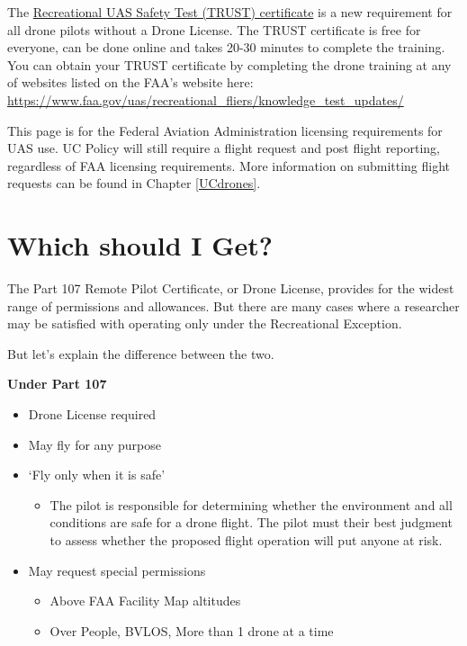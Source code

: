 \documentclass[
  12pt,
]{book}
\providecommand{\tightlist}{%
  \setlength{\itemsep}{0pt}\setlength{\parskip}{0pt}}
\newenvironment{notebox}{
  \definecolor{shadecolor}{gray}{.8}  %
  \color{black}
  \begin{shaded}}
 {\end{shaded}}
\begin{document}
The \protect\hyperlink{TRUST}{Recreational UAS Safety Test (TRUST) certificate} is a new requirement for all drone pilots without a Drone License. The TRUST certificate is free for everyone, can be done online and takes 20-30 minutes to complete the training. You can obtain your TRUST certificate by completing the drone training at any of websites listed on the FAA's website here: \url{https://www.faa.gov/uas/recreational_fliers/knowledge_test_updates/}

\begin{notebox}
This page is for the Federal Aviation Administration licensing requirements for UAS use. UC Policy will still require a flight request and post flight reporting, regardless of FAA licensing requirements. More information on submitting flight requests can be found in Chapter \ref{UCdrones}.

\end{notebox}

\hypertarget{difference}{%
\section{Which should I Get?}\label{difference}}

The Part 107 Remote Pilot Certificate, or Drone License, provides for the widest range of permissions and allowances. But there are many cases where a researcher may be satisfied with operating only under the Recreational Exception.

But let's explain the difference between the two.

\textbf{Under Part 107}

\begin{itemize}
\tightlist
\item
  Drone License required
\item
  May fly for any purpose
\item
  `Fly only when it is safe'

  \begin{itemize}
  \tightlist
  \item
    The pilot is responsible for determining whether the environment and all conditions are safe for a drone flight. The pilot must their best judgment to assess whether the proposed flight operation will put anyone at risk.
  \end{itemize}
\item
  May request special permissions

  \begin{itemize}
  \tightlist
  \item
    Above FAA Facility Map altitudes
  \item
    Over People, BVLOS, More than 1 drone at a time
  \end{itemize}
\end{itemize}
\end{document}
